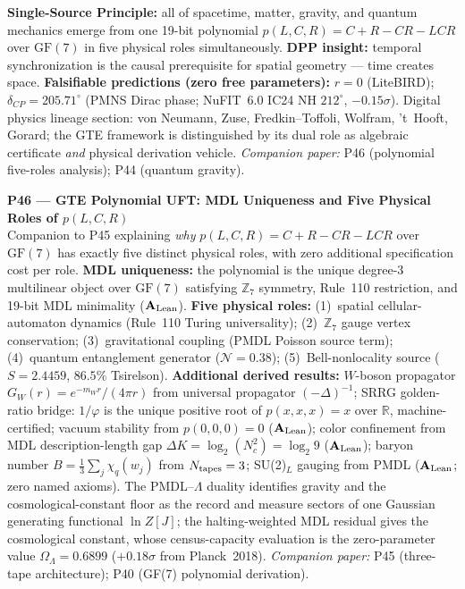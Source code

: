 \documentclass[11pt]{article}
\newcommand{\CatAL}{\ensuremath{\textbf{A}_{\rm Lean}}}
\begin{document}
\textbf{Single-Source Principle:} all of spacetime, matter, gravity, and quantum
mechanics emerge from one 19-bit polynomial
$p(L,C,R) = C + R - CR - LCR$ over $\mathrm{GF}(7)$ in five physical roles
simultaneously.
\textbf{DPP insight:} temporal synchronization is the causal prerequisite for
spatial geometry --- time creates space.
\textbf{Falsifiable predictions (zero free parameters):}
$r = 0$ (LiteBIRD); $\delta_{CP} = 205.71^\circ$ (PMNS Dirac phase;
NuFIT~6.0 IC24 NH $212^\circ$, $-0.15\sigma$).
Digital physics lineage section: von Neumann, Zuse, Fredkin--Toffoli, Wolfram,
't~Hooft, Gorard; the GTE framework is distinguished by its dual role as algebraic
certificate \emph{and} physical derivation vehicle.
\emph{Companion paper:} P46 (polynomial five-roles analysis); P44 (quantum gravity).

\medskip
\noindent\textbf{P46 — GTE Polynomial UFT: MDL Uniqueness and Five Physical Roles of $p(L,C,R)$}~\cite{SpivackGTEPolynomialUFT}\\
Companion to P45 explaining \emph{why} $p(L,C,R) = C + R - CR - LCR$ over $\mathrm{GF}(7)$
has exactly five distinct physical roles, with zero additional specification cost per role.
\textbf{MDL uniqueness:} the polynomial is the unique degree-3 multilinear object
over $\mathrm{GF}(7)$ satisfying $\mathbb{Z}_7$ symmetry, Rule~110 restriction, and
19-bit MDL minimality ($\CatAL$).
\textbf{Five physical roles:} (1)~spatial cellular-automaton dynamics (Rule~110
Turing universality); (2)~$\mathbb{Z}_7$ gauge vertex conservation; (3)~gravitational
coupling (PMDL Poisson source term); (4)~quantum entanglement generator ($\mathcal{N}=0.38$);
(5)~Bell-nonlocality source ($S=2.4459$, $86.5\%$ Tsirelson).
\textbf{Additional derived results:}
$W$-boson propagator $G_W(r) = e^{-m_W r}/(4\pi r)$ from universal propagator
$(-\Delta)^{-1}$; SRRG golden-ratio bridge: $1/\varphi$ is the unique positive root
of $p(x,x,x) = x$ over $\mathbb{R}$, machine-certified; vacuum stability from
$p(0,0,0) = 0$ ($\CatAL$); color confinement from MDL description-length gap
$\Delta K = \log_2(N_c^2) = \log_2 9$ ($\CatAL$); baryon number
$B = \tfrac{1}{3}\sum_j \chi_q(w_j)$ from $N_{\rm tapes}=3$;
SU(2)$_L$ gauging from PMDL ($\CatAL$; zero named axioms).
The PMDL--$\Lambda$ duality identifies gravity and the cosmological-constant floor
as the record and measure sectors of one Gaussian generating functional
$\ln Z[J]$; the halting-weighted MDL residual gives the cosmological constant,
whose census-capacity evaluation is the zero-parameter value
$\Omega_\Lambda = 0.6899$ ($+0.18\sigma$ from Planck~2018).
\emph{Companion paper:} P45 (three-tape architecture); P40 (GF(7) polynomial derivation).
\end{document}
